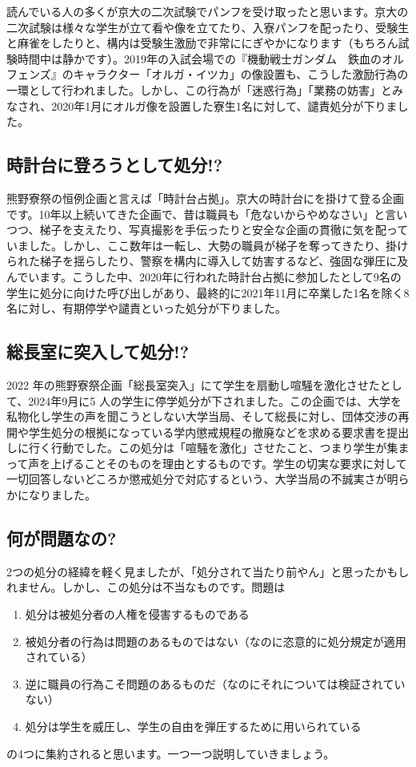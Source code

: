読んでいる人の多くが京大の二次試験でパンフを受け取ったと思います。京大の二次試験は様々な学生が立て看や像を立てたり、入寮パンフを配ったり、受験生と麻雀をしたりと、構内は受験生激励で非常ににぎやかになります（もちろん試験時間中は静かです）。2019年の入試会場での『機動戦士ガンダム　鉄血のオルフェンズ』のキャラクター「オルガ・イツカ」の像設置も、こうした激励行為の一環として行われました。しかし、この行為が「迷惑行為」「業務の妨害」とみなされ、2020年1月にオルガ像を設置した寮生1名に対して、譴責処分が下りました。

\subsection{時計台に登ろうとして処分!?}
熊野寮祭の恒例企画と言えば「時計台占拠」。京大の時計台にを掛けて登る企画です。10年以上続いてきた企画で、昔は職員も「危ないからやめなさい」と言いつつ、梯子を支えたり、写真撮影を手伝ったりと安全な企画の貫徹に気を配っていました。しかし、ここ数年は一転し、大勢の職員が梯子を奪ってきたり、掛けられた梯子を揺らしたり、警察を構内に導入して妨害するなど、強固な弾圧に及んでいます。こうした中、2020年に行われた時計台占拠に参加したとして9名の学生に処分に向けた呼び出しがあり、最終的に2021年11月に卒業した1名を除く8名に対し、有期停学や譴責といった処分が下りました。

\subsection{総長室に突入して処分!?}
2022 年の熊野寮祭企画「総長室突入」にて学生を扇動し喧騒を激化させたとして、2024年9月に5 人の学生に停学処分が下されました。この企画では、大学を私物化し学生の声を聞こうとしない大学当局、そして総長に対し、団体交渉の再開や学生処分の根拠になっている学内懲戒規程の撤廃などを求める要求書を提出しに行く行動でした。この処分は「喧騒を激化」させたこと、つまり学生が集まって声を上げることそのものを理由とするものです。学生の切実な要求に対して一切回答しないどころか懲戒処分で対応するという、大学当局の不誠実さが明らかになりました。



\subsection{何が問題なの?}
2つの処分の経緯を軽く見ましたが、「処分されて当たり前やん」と思ったかもしれません。しかし、この処分は不当なものです。問題は
\begin{enumerate}
    \item 処分は被処分者の人権を侵害するものである
    \item 被処分者の行為は問題のあるものではない（なのに恣意的に処分規定が適用されている）
    \item 逆に職員の行為こそ問題のあるものだ（なのにそれについては検証されていない）
    \item 処分は学生を威圧し、学生の自由を弾圧するために用いられている
\end{enumerate}
の4つに集約されると思います。一つ一つ説明していきましょう。

